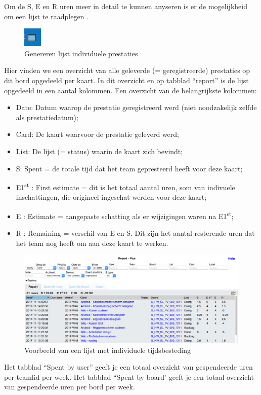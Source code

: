 Om de S, E en R uren meer in detail te kunnen anyseren is er de mogelijkheid om een lijst te raadplegen . 
\begin{figure}[H]
	\centering
	\includegraphics[scale=0.75]{./afbeeldingen/individueleprestatiesknop.png}
	\caption{Genereren lijst individuele prestaties}
	\label{fig:individueleprestatiesknop}	
\end{figure} 
\noindent
Hier vinden we een overzicht van alle geleverde (= geregistreerde) prestaties op dit bord opgedeeld per kaart. In dit overzicht  en op tabblad ``report'' is de lijst opgedeeld in een aantal kolommen. Een overzicht van de belangrijkste kolommen:
\begin{itemize}[nolistsep]
	\item Date: Datum waarop de prestatie geregistreerd werd (niet noodzakelijk zelfde als prestatiedatum);
	\item Card: De kaart waarvoor de prestatie geleverd werd;
	\item List: De lijst (= status) waarin de kaart zich bevindt;
	\item S: Spent = de totale tijd dat het team gepresteerd heeft voor deze kaart;
	\item E1\textsuperscript{st} : First estimate = dit is het totaal aantal uren, som van indivuele inschattingen, die origineel ingeschat werden voor deze kaart;
	\item E : Estimate = aangepaste schatting als er wijzigingen waren na E1\textsuperscript{st};
	\item R : Remaining = verschil van E en S. Dit zijn het aantal resterende uren dat het team nog heeft om aan deze kaart te werken.
\end{itemize}
\begin{figure}[h]
	\centering
	\includegraphics[width=\textwidth]{./afbeeldingen/individueleprestaties.png}
	\caption{Voorbeeld van een lijst met individuele tijdsbesteding}
	\label{fig:individueleprestaties}	
\end{figure} 
Het tabblad ``Spent by user'' geeft je een totaal overzicht van gespendeerde uren per teamlid per week.
Het tabblad ``Spent by board' geeft je een totaal overzicht van gespendeerde uren per bord per week.


